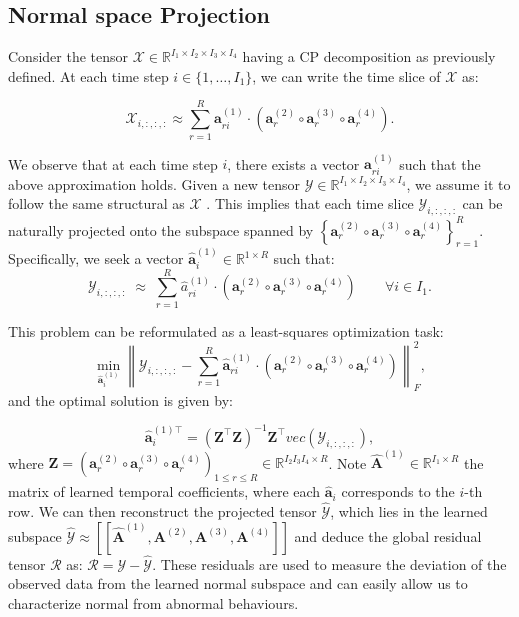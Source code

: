 \documentclass[preprint,12pt,authoryear]{elsarticle}
\begin{document}
\subsection{Normal space Projection}
Consider the tensor \(\mathcal{X} \in \mathbb{R}^{I_1 \times I_2 \times I_3 \times I_4}\) having a CP decomposition as previously defined. At each time step \(i \in \{1, \dots, I_1\}\), we can write the time slice of \(\mathcal{X}\) as:

\begin{equation}
\mathcal{X}_{i,:,:,:} \approx \sum_{r=1}^{R} \mathbf{a}_{ri}^{(1)} \cdot \left( \mathbf{a}_r^{(2)} \circ \mathbf{a}_r^{(3)} \circ \mathbf{a}_r^{(4)} \right).
\end{equation}

\noindent We observe that at each time step \(i\), there exists a vector \(\mathbf{a}_{ri}^{(1)}\) such that the above approximation holds. Given a new tensor \(\mathcal{Y} \in \mathbb{R}^{I_1 \times I_2 \times I_3 \times I_4}\), we assume it to follow the same structural as \(\mathcal{X}\)  . This implies that each time slice \(\mathcal{Y}_{i,:,:,:}\) can be naturally projected onto the subspace spanned by \(\left\{\mathbf{a}_r^{(2)} \circ \mathbf{a}_r^{(3)} \circ \mathbf{a}_r^{(4)}  \right\}_{r=1}^{R}
\). Specifically, we seek a vector \(\hat{\mathbf{a}}_{i}^{(1)} \in \mathbb{R}^{1 \times R}\) such that:
\begin{equation}
\mathcal{Y}_{i,:,:,:} \;\approx\; 
\sum_{r=1}^{R} \hat{a}^{(1)}_{ri} \cdot 
\left( \mathbf{a}_r^{(2)} \circ \mathbf{a}_r^{(3)} \circ \mathbf{a}_r^{(4)} \right)
\qquad \forall i \in I_1.
\end{equation}



\noindent This problem can be reformulated as a least-squares optimization task:
\begin{equation}
\min_{\hat{\mathbf{a}}_{i}^{(1)}} \left\| \mathcal{Y}_{i,:,:,:} - \sum_{r=1}^{R} \hat{\mathbf{a}}_{ri}^{(1)} \cdot \left( \mathbf{a}_r^{(2)} \circ \mathbf{a}_r^{(3)} \circ \mathbf{a}_r^{(4)} \right)\right\|_F^2,
\end{equation} and the optimal solution is given by: 

\begin{equation}
\hat{\mathbf{a}}_{i}^{{(1)}\top} = \left(\mathbf{Z}^\top \mathbf{Z} \right)^{-1} \mathbf{Z}^\top vec(\mathcal{Y}_{i,:,:,:}),
\end{equation}
where \(\mathbf{Z}=\left( \mathbf{a}_r^{(2)} \circ \mathbf{a}_r^{(3)} \circ \mathbf{a}_r^{(4)} \right)_{1\leq r\leq R} \in \mathbb{R}^{I_2I_3I_4 \times R}\).
Note \(\mathbf{\hat{A}}^{(1)} \in \mathbb{R}^{I_1 \times R}\)  the matrix of learned temporal coefficients, where each  \(\hat{\mathbf{a}}_i\) corresponds to the $i$-th row. We can then reconstruct the projected tensor \(\mathcal{\hat{Y}}\), which lies in the learned subspace \(
\mathcal{\hat{Y}} \approx [\![\mathbf{\hat{A}}^{(1)}, \mathbf{A}^{(2)}, \mathbf{A}^{(3)}, \mathbf{A}^{(4)}]\!]
\) and deduce the global residual tensor $\mathcal{R}$ as:
\(\mathcal{R} = \mathcal{Y} - \mathcal{\hat{Y}}.\)
These residuals are used to measure the deviation of the observed data from the learned normal subspace and can easily allow us to characterize normal from abnormal behaviours.
\end{document}
